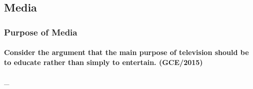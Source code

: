 \documentclass[../../main]{subfiles}
\begin{document}
\subsection{Media}

\subsubsection{Purpose of Media}

\paragraph{Consider the argument that the main purpose of television should be to educate rather than simply to entertain. (GCE/2015)} \_
\end{document}

